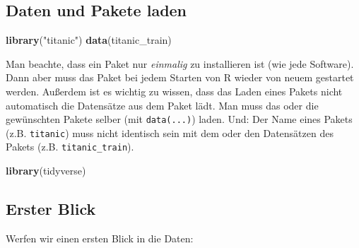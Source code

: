 \documentclass[12pt,ngerman,]{book}
\makeatletter
\newenvironment{Shaded}{\begin{snugshade}}{\end{snugshade}}
\newcommand{\KeywordTok}[1]{\textcolor[rgb]{0.13,0.29,0.53}{\textbf{{#1}}}}
\newcommand{\StringTok}[1]{\textcolor[rgb]{0.31,0.60,0.02}{{#1}}}
\newcommand{\NormalTok}[1]{{#1}}
\newenvironment{kframe}{%
\medskip{}
\setlength{\fboxsep}{.8em}
 \def\at@end@of@kframe{}%
 \ifinner\ifhmode%
  \def\at@end@of@kframe{\end{minipage}}%
  \begin{minipage}{\columnwidth}%
 \fi\fi%
 \def\FrameCommand##1{\hskip\@totalleftmargin \hskip-\fboxsep
 \colorbox{shadecolor}{##1}\hskip-\fboxsep
     \hskip-\linewidth \hskip-\@totalleftmargin \hskip\columnwidth}%
 \MakeFramed {\advance\hsize-\width
   \@totalleftmargin\z@ \linewidth\hsize
   \@setminipage}}%
 {\par\unskip\endMakeFramed%
 \at@end@of@kframe}
\renewenvironment{Shaded}{\begin{kframe}}{\end{kframe}}
\theoremstyle{definition}
\theoremstyle{definition}
\theoremstyle{remark}
\makeatother
\begin{document}
\subsection{Daten und Pakete laden}\label{daten-und-pakete-laden}

\begin{Shaded}
\begin{Highlighting}[]
\KeywordTok{library}\NormalTok{(}\StringTok{"titanic"}\NormalTok{)}
\KeywordTok{data}\NormalTok{(titanic_train)}
\end{Highlighting}
\end{Shaded}

Man beachte, dass ein Paket nur \emph{einmalig} zu installieren ist (wie
jede Software). Dann aber muss das Paket bei jedem Starten von R wieder
von neuem gestartet werden. Außerdem ist es wichtig zu wissen, dass das
Laden eines Pakets nicht automatisch die Datensätze aus dem Paket lädt.
Man muss das oder die gewünschten Pakete selber (mit \texttt{data(...)})
laden. Und: Der Name eines Pakets (z.B. \texttt{titanic}) muss nicht
identisch sein mit dem oder den Datensätzen des Pakets (z.B.
\texttt{titanic\_train}).

\begin{Shaded}
\begin{Highlighting}[]
\KeywordTok{library}\NormalTok{(tidyverse)}
\end{Highlighting}
\end{Shaded}

\subsection{Erster Blick}\label{erster-blick}

Werfen wir einen ersten Blick in die Daten:
\end{document}
